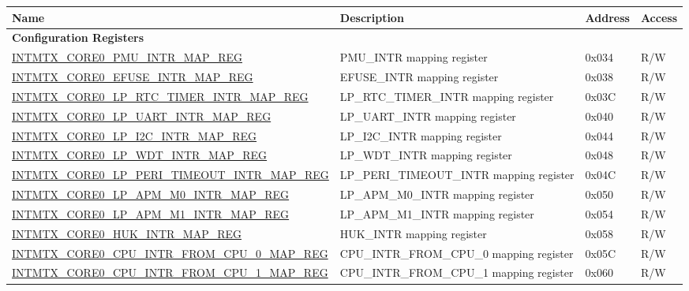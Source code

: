 \begin{longtable}{ | p{10cm} | p{10cm} | p{1.3cm} | p{1cm} | }
\hline\rowcolor{lightgray}
Name & Description &  Address & Access \\ \hline
\endhead
\multicolumn{4}{|l|}{\textbf{Configuration Registers}} \\ \hline

\hyperref[regdesc:INTMTXCORE0PMUINTRMAPREG]{INTMTX\_CORE0\_PMU\_INTR\_MAP\_REG} & PMU\_INTR mapping register & 0x034 & R/W  \\ \hline
\hyperref[regdesc:INTMTXCORE0EFUSEINTRMAPREG]{INTMTX\_CORE0\_EFUSE\_INTR\_MAP\_REG} & EFUSE\_INTR mapping register & 0x038 & R/W  \\ \hline
\hyperref[regdesc:INTMTXCORE0LPRTCTIMERINTRMAPREG]{INTMTX\_CORE0\_LP\_RTC\_TIMER\_INTR\_MAP\_REG} & LP\_RTC\_TIMER\_INTR mapping register & 0x03C & R/W  \\ \hline
\hyperref[regdesc:INTMTXCORE0LPUARTINTRMAPREG]{INTMTX\_CORE0\_LP\_UART\_INTR\_MAP\_REG} & LP\_UART\_INTR mapping register & 0x040 & R/W  \\ \hline
\hyperref[regdesc:INTMTXCORE0LPI2CINTRMAPREG]{INTMTX\_CORE0\_LP\_I2C\_INTR\_MAP\_REG} & LP\_I2C\_INTR mapping register & 0x044 & R/W  \\ \hline
\hyperref[regdesc:INTMTXCORE0LPWDTINTRMAPREG]{INTMTX\_CORE0\_LP\_WDT\_INTR\_MAP\_REG} & LP\_WDT\_INTR mapping register & 0x048 & R/W  \\ \hline
\hyperref[regdesc:INTMTXCORE0LPPERITIMEOUTINTRMAPREG]{INTMTX\_CORE0\_LP\_PERI\_TIMEOUT\_INTR\_MAP\_REG} & LP\_PERI\_TIMEOUT\_INTR mapping register & 0x04C & R/W  \\ \hline
\hyperref[regdesc:INTMTXCORE0LPAPMM0INTRMAPREG]{INTMTX\_CORE0\_LP\_APM\_M0\_INTR\_MAP\_REG} & LP\_APM\_M0\_INTR mapping register & 0x050 & R/W  \\ \hline
\hyperref[regdesc:INTMTXCORE0LPAPMM1INTRMAPREG]{INTMTX\_CORE0\_LP\_APM\_M1\_INTR\_MAP\_REG} & LP\_APM\_M1\_INTR mapping register & 0x054 & R/W  \\ \hline
\hyperref[regdesc:INTMTXCORE0HUKINTRMAPREG]{INTMTX\_CORE0\_HUK\_INTR\_MAP\_REG} & HUK\_INTR mapping register & 0x058 & R/W  \\ \hline
\hyperref[regdesc:INTMTXCORE0CPUINTRFROMCPU0MAPREG]{INTMTX\_CORE0\_CPU\_INTR\_FROM\_CPU\_0\_MAP\_REG} & CPU\_INTR\_FROM\_CPU\_0 mapping register & 0x05C & R/W  \\ \hline
\hyperref[regdesc:INTMTXCORE0CPUINTRFROMCPU1MAPREG]{INTMTX\_CORE0\_CPU\_INTR\_FROM\_CPU\_1\_MAP\_REG} & CPU\_INTR\_FROM\_CPU\_1 mapping register & 0x060 & R/W  \\ \hline

\end{longtable}
